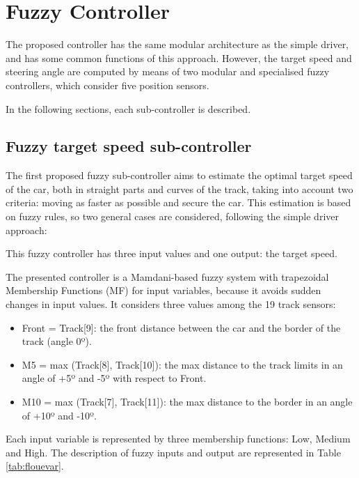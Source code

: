 \documentclass[runningheads,a4paper]{llncs}
\begin{document}
	
	\section{Fuzzy Controller}
	\label{sec:fuzzy_controller}
	
	The proposed controller has the same modular architecture as the simple driver, and has some common functions of this approach. 
	However, the target speed and steering angle are computed by means of two modular and specialised fuzzy controllers, which consider five position sensors.
	
	In the following sections, each sub-controller is described.
	
	
	\subsection{Fuzzy target speed sub-controller}
	
	The first proposed fuzzy sub-controller aims to estimate the optimal target speed of the car, both in straight parts and curves of the track, taking into account two criteria: moving as faster as possible and secure the car. This estimation is based on fuzzy rules, so two general cases are considered, following the simple driver approach:
	
	This fuzzy controller has three input values and one output: the target speed.

	The presented controller   is a Mamdani-based fuzzy system \cite{iancu2012} with trapezoidal Membership Functions (MF) for input variables, because it avoids sudden changes in input values. It considers three values among the 19 track sensors:
	
	\begin{itemize}
		\item Front = Track[9]: the front distance between the car and the border of the track (angle 0º).
		\item M5 = max (Track[8], Track[10]): the max distance to the track limits in an angle of +5º and -5º with respect to Front.
		\item M10 = max (Track[7], Track[11]): the max distance to the border in an angle of +10º and -10º.
	\end{itemize}
	
	
	Each input variable is represented by three membership functions: Low, Medium and High. The description of fuzzy inputs and output are represented in Table \ref{tab:flouevar}.
	
\end{document}
